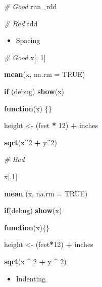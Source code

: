 \documentclass[
]{book}
\newenvironment{Shaded}{\begin{snugshade}}{\end{snugshade}}
\newcommand{\CommentTok}[1]{\textcolor[rgb]{0.56,0.35,0.01}{\textit{#1}}}
\newcommand{\ControlFlowTok}[1]{\textcolor[rgb]{0.13,0.29,0.53}{\textbf{#1}}}
\newcommand{\DataTypeTok}[1]{\textcolor[rgb]{0.13,0.29,0.53}{#1}}
\newcommand{\DecValTok}[1]{\textcolor[rgb]{0.00,0.00,0.81}{#1}}
\newcommand{\KeywordTok}[1]{\textcolor[rgb]{0.13,0.29,0.53}{\textbf{#1}}}
\newcommand{\NormalTok}[1]{#1}
\newcommand{\OperatorTok}[1]{\textcolor[rgb]{0.81,0.36,0.00}{\textbf{#1}}}
\newcommand{\OtherTok}[1]{\textcolor[rgb]{0.56,0.35,0.01}{#1}}
\newcommand{\StringTok}[1]{\textcolor[rgb]{0.31,0.60,0.02}{#1}}
\providecommand{\tightlist}{%
  \setlength{\itemsep}{0pt}\setlength{\parskip}{0pt}}
\begin{document}
\begin{Shaded}
\begin{Highlighting}[]
\CommentTok{\# Good }
\NormalTok{run\_rdd }

\CommentTok{\# Bad }
\NormalTok{rdd}
\end{Highlighting}
\end{Shaded}

\begin{itemize}
\tightlist
\item
  Spacing
\end{itemize}

\begin{Shaded}
\begin{Highlighting}[]
\CommentTok{\# Good}
\NormalTok{x[, }\DecValTok{1}\NormalTok{] }

\KeywordTok{mean}\NormalTok{(x, }\DataTypeTok{na.rm =} \OtherTok{TRUE}\NormalTok{) }

\ControlFlowTok{if}\NormalTok{ (debug) }\KeywordTok{show}\NormalTok{(x) }

\ControlFlowTok{function}\NormalTok{(x) \{\}}

\NormalTok{height <{-}}\StringTok{ }\NormalTok{(feet }\OperatorTok{*}\StringTok{ }\DecValTok{12}\NormalTok{) }\OperatorTok{+}\StringTok{ }\NormalTok{inches}

\KeywordTok{sqrt}\NormalTok{(x}\OperatorTok{\^{}}\DecValTok{2} \OperatorTok{+}\StringTok{ }\NormalTok{y}\OperatorTok{\^{}}\DecValTok{2}\NormalTok{)}

\CommentTok{\# Bad}

\NormalTok{x[,}\DecValTok{1}\NormalTok{]}

\KeywordTok{mean}\NormalTok{ (x, }\DataTypeTok{na.rm =} \OtherTok{TRUE}\NormalTok{)}

\ControlFlowTok{if}\NormalTok{(debug) }\KeywordTok{show}\NormalTok{(x)}

\ControlFlowTok{function}\NormalTok{(x)\{\}}

\NormalTok{height <{-}}\StringTok{ }\NormalTok{(feet}\OperatorTok{*}\DecValTok{12}\NormalTok{) }\OperatorTok{+}\StringTok{ }\NormalTok{inches}

\KeywordTok{sqrt}\NormalTok{(x }\OperatorTok{\^{}}\StringTok{ }\DecValTok{2} \OperatorTok{+}\StringTok{ }\NormalTok{y }\OperatorTok{\^{}}\StringTok{ }\DecValTok{2}\NormalTok{)}
\end{Highlighting}
\end{Shaded}

\begin{itemize}
\tightlist
\item
  Indenting
\end{itemize}
\end{document}
